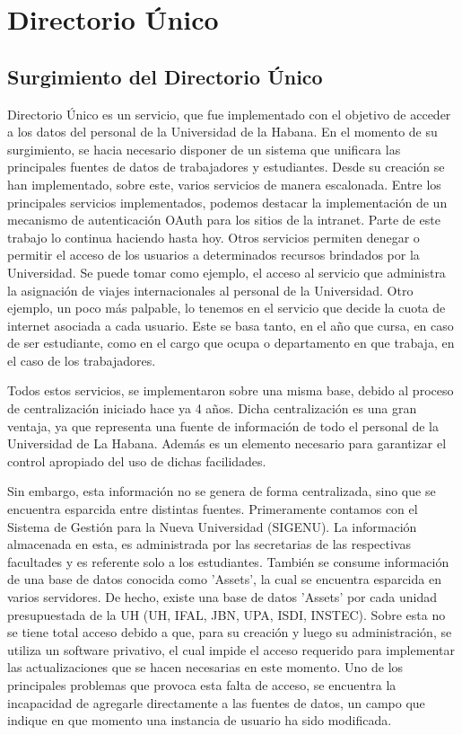 \chapter{Directorio Único}

\section{Surgimiento del Directorio Único}

Directorio Único es un servicio, que fue implementado con el objetivo de acceder a los datos 
del personal de la Universidad de la Habana. En el momento de su surgimiento, se hacia 
necesario disponer de un sistema que unificara las principales fuentes de datos de 
trabajadores y estudiantes. Desde su creación se han implementado, sobre este, varios 
servicios de manera escalonada. Entre los principales servicios implementados, podemos 
destacar la implementación de un mecanismo de autenticación OAuth para los sitios de la 
intranet. Parte de este trabajo lo continua haciendo hasta hoy. Otros servicios permiten
denegar o permitir el acceso de los usuarios a determinados recursos brindados por la 
Universidad. Se puede tomar como ejemplo, el acceso al servicio que administra la 
asignación de viajes internacionales al personal de la Universidad. Otro ejemplo, un poco 
más palpable, lo tenemos en el servicio que decide la cuota de internet asociada a cada
usuario. Este se basa tanto, en el año que cursa, en caso de ser estudiante, como en el 
cargo que ocupa o departamento en que trabaja, en el caso de los trabajadores.

Todos estos servicios, se implementaron sobre una misma base, debido al proceso de 
centralización iniciado hace ya 4 años. Dicha centralización es una gran ventaja, ya
que representa una fuente de información de todo el personal de la Universidad de La Habana. 
Además es un elemento necesario para garantizar el control apropiado del uso de dichas 
facilidades.

Sin embargo, esta información no se genera de forma centralizada, sino que se encuentra 
esparcida entre distintas fuentes. Primeramente contamos con el Sistema de Gestión para la 
Nueva Universidad (SIGENU). La información almacenada en esta, es administrada por las 
secretarias de las respectivas facultades y es referente solo a los estudiantes. También se
consume información de una base de datos conocida como 'Assets', la cual se encuentra 
esparcida en varios servidores. De hecho, existe una base de datos 'Assets' por cada unidad
presupuestada de la UH (UH, IFAL, JBN, UPA, ISDI, INSTEC). Sobre esta no se tiene total 
acceso debido a que, para su creación y luego su administración, se utiliza un software 
privativo, el cual impide el acceso requerido para implementar las actualizaciones que se 
hacen necesarias en este momento. 
Uno de los principales problemas que provoca esta falta de acceso, se encuentra la 
incapacidad de agregarle directamente a las fuentes de datos, un campo que indique en que 
momento una instancia de usuario ha sido modificada. 

